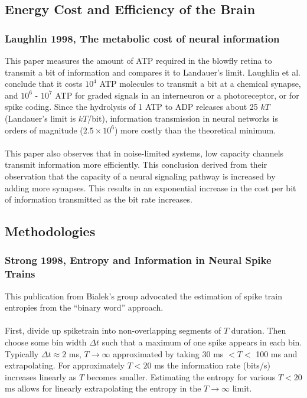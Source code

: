 \documentclass{article}
\begin{document}
\subsection{Energy Cost and Efficiency of the Brain}
\subsubsection{Laughlin 1998, The metabolic cost of neural information}
This paper measures the amount of ATP required in the blowfly retina to transmit a bit of information and compares it to Landauer's limit.  Laughlin et al. conclude that it costs $10^4$ ATP molecules to transmit a bit at a chemical synapse, and $10^6$ - $10^7$ ATP for graded signals in an interneuron or a photoreceptor, or for spike coding.  Since the hydrolysis of 1 ATP to ADP releases about 25 $kT$ (Landauer's limit is $kT$/bit), information transmission in neural networks is orders of magnitude ($2.5 \times 10^6$) more costly than the theoretical minimum.\\
\\
This paper also observes that in noise-limited systems, low capacity channels transmit information more efficiently.  This conclusion derived from their observation that the capacity of a neural signaling pathway is increased by adding more synapses.  This results in an exponential increase in the cost per bit of information transmitted as the bit rate increases.
 
 
\subsection{Methodologies}
\subsubsection{Strong 1998, Entropy and Information in Neural Spike Trains}
This publication from Bialek's group advocated the estimation of spike train entropies from the ``binary word'' approach.\\
\\
First, divide up spiketrain into non-overlapping segments of $T$ duration. Then choose some bin width $\Delta t$ such that a maximum of one spike appears in each bin.  Typically $\Delta t \approx 2$ ms, $T \to \infty$ approximated by taking 30 ms $< T <$ 100 ms and extrapolating.  For  approximately $T < 20$ ms the information rate (bits/s) increases linearly as $T$ becomes smaller.  Estimating the entropy for various $T < 20$ ms allows for linearly extrapolating the entropy in the $T \to \infty$ limit.
\end{document}
